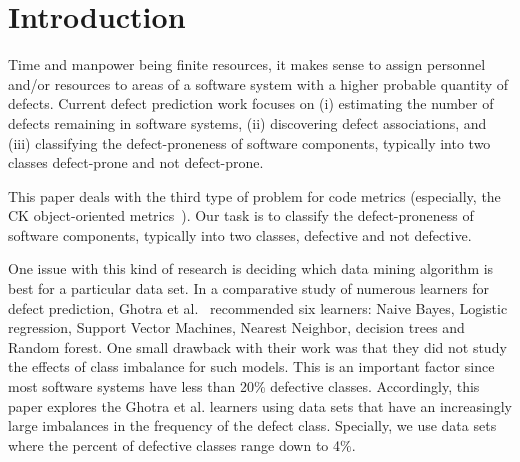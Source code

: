 \documentclass[sigconf,review, anonymous]{acmart}
\theoremstyle{break}
\begin{document}

\maketitle




\section{Introduction}

Time and manpower being finite resources, it
makes sense to assign personnel and/or resources to areas of
a software system with a higher probable quantity of defects. Current defect prediction work focuses on (i) estimating the number of defects remaining in software systems, (ii) discovering defect associations, and (iii) classifying the defect-proneness of software components, typically into two classes defect-prone and not defect-prone. 


This paper deals with the third type of problem for code metrics (especially, the 
CK object-oriented metrics~\cite{chidamber1994metrics}).
Our task is to classify the defect-proneness of software components, typically into two classes, defective and not defective.

One issue with this kind of research is deciding
which data mining algorithm is best for a particular
data set. In a comparative study of numerous
learners for defect prediction, Ghotra et al.~\cite{ghotra2015revisiting} recommended six learners: Naive Bayes, Logistic regression, Support Vector Machines, Nearest Neighbor, decision trees and Random forest. One small drawback with their
work was that they did not study the effects of class imbalance for such models.
This is an important factor
since most software systems have less than 20\% defective classes. Accordingly, this paper
explores the Ghotra et al. learners using data
sets that have an increasingly large imbalances
in the frequency of the defect class. Specially, we use data sets where the percent
of defective classes
range down to 4\%. 
\end{document}
